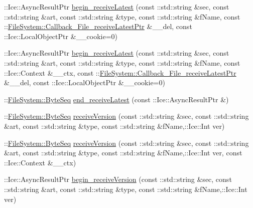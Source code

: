\begin{DoxyCompactItemize}
\item 
\+::Ice\+::\+Async\+Result\+Ptr \hyperlink{class_ice_proxy_1_1_file_system_1_1_file_a1367692f927b1a40d2a338efc588f4ff}{begin\+\_\+receive\+Latest} (const \+::std\+::string \&sec, const \+::std\+::string \&art, const \+::std\+::string \&type, const \+::std\+::string \&f\+Name, const \+::\hyperlink{namespace_file_system_a86fe38e325e02ddd26f665f486d51837}{File\+System\+::\+Callback\+\_\+\+File\+\_\+receive\+Latest\+Ptr} \&\+\_\+\+\_\+del, const \+::Ice\+::\+Local\+Object\+Ptr \&\+\_\+\+\_\+cookie=0)
\item 
\+::Ice\+::\+Async\+Result\+Ptr \hyperlink{class_ice_proxy_1_1_file_system_1_1_file_ad8d75389e9e2115727c65b92f8a09b27}{begin\+\_\+receive\+Latest} (const \+::std\+::string \&sec, const \+::std\+::string \&art, const \+::std\+::string \&type, const \+::std\+::string \&f\+Name, const \+::Ice\+::\+Context \&\+\_\+\+\_\+ctx, const \+::\hyperlink{namespace_file_system_a86fe38e325e02ddd26f665f486d51837}{File\+System\+::\+Callback\+\_\+\+File\+\_\+receive\+Latest\+Ptr} \&\+\_\+\+\_\+del, const \+::Ice\+::\+Local\+Object\+Ptr \&\+\_\+\+\_\+cookie=0)
\item 
\+::\hyperlink{namespace_file_system_a5c85de065f9c451ae1d1dea2dacb68c5}{File\+System\+::\+Byte\+Seq} \hyperlink{class_ice_proxy_1_1_file_system_1_1_file_a4993bd781a99fe53e71bef94a752f543}{end\+\_\+receive\+Latest} (const \+::Ice\+::\+Async\+Result\+Ptr \&)
\item 
\+::\hyperlink{namespace_file_system_a5c85de065f9c451ae1d1dea2dacb68c5}{File\+System\+::\+Byte\+Seq} \hyperlink{class_ice_proxy_1_1_file_system_1_1_file_aef65d4fa3028c32e712162aea839f4f6}{receive\+Version} (const \+::std\+::string \&sec, const \+::std\+::string \&art, const \+::std\+::string \&type, const \+::std\+::string \&f\+Name,\+::Ice\+::\+Int ver)
\item 
\+::\hyperlink{namespace_file_system_a5c85de065f9c451ae1d1dea2dacb68c5}{File\+System\+::\+Byte\+Seq} \hyperlink{class_ice_proxy_1_1_file_system_1_1_file_af1ea34ee0b4b9579e684c363f1826243}{receive\+Version} (const \+::std\+::string \&sec, const \+::std\+::string \&art, const \+::std\+::string \&type, const \+::std\+::string \&f\+Name,\+::Ice\+::\+Int ver, const \+::Ice\+::\+Context \&\+\_\+\+\_\+ctx)
\item 
\+::Ice\+::\+Async\+Result\+Ptr \hyperlink{class_ice_proxy_1_1_file_system_1_1_file_a4f6e2f8b3fbb888b74ed6e40d1da51b3}{begin\+\_\+receive\+Version} (const \+::std\+::string \&sec, const \+::std\+::string \&art, const \+::std\+::string \&type, const \+::std\+::string \&f\+Name,\+::Ice\+::\+Int ver)

\end{DoxyCompactItemize}
